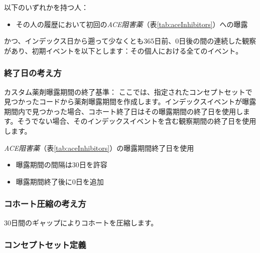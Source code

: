 \documentclass[
  11pt]{book}
\providecommand{\tightlist}{%
  \setlength{\itemsep}{0pt}\setlength{\parskip}{0pt}}
\theoremstyle{definition}
\theoremstyle{definition}
\theoremstyle{definition}
\theoremstyle{definition}
\theoremstyle{remark}
\begin{document}
以下のいずれかを持つ人：

\begin{itemize}
\tightlist
\item
  その人の履歴において初回の\emph{ACE阻害薬}（表\ref{tab:aceInhibitors}）への曝露
\end{itemize}

かつ、インデックス日から遡って少なくとも365日前、0日後の間の連続した観察があり、初期イベントを以下とします：その個人における全てのイベント。

\subsubsection*{終了日の考え方}\label{ux7d42ux4e86ux65e5ux306eux8003ux3048ux65b9}

カスタム薬剤曝露期間の終了基準：
ここでは、指定されたコンセプトセットで見つかったコードから薬剤曝露期間を作成します。インデックスイベントが曝露期間内で見つかった場合、コホート終了日はその曝露期間の終了日を使用します。そうでない場合、そのインデックスイベントを含む観察期間の終了日を使用します。

\emph{ACE阻害薬}（表\ref{tab:aceInhibitors}）の曝露期間終了日を使用

\begin{itemize}
\tightlist
\item
  曝露期間の間隔は30日を許容
\item
  曝露期間終了後に0日を追加
\end{itemize}

\subsubsection*{コホート圧縮の考え方}\label{ux30b3ux30dbux30fcux30c8ux5727ux7e2eux306eux8003ux3048ux65b9}

30日間のギャップによりコホートを圧縮します。

\subsubsection*{コンセプトセット定義}\label{ux30b3ux30f3ux30bbux30d7ux30c8ux30bbux30c3ux30c8ux5b9aux7fa9}
\end{document}
